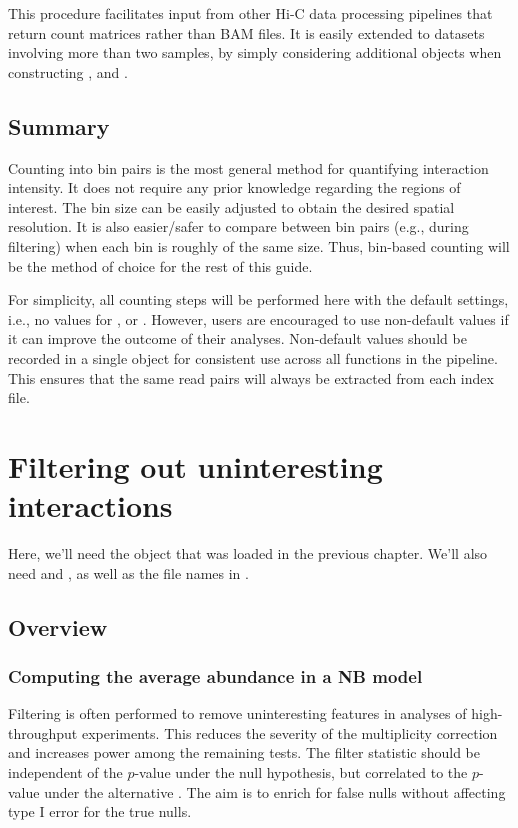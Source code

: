 \documentclass{report}\usepackage[]{graphicx}\usepackage[usenames,dvipsnames]{color}
\newenvironment{combox}
{ \definecolor{shadecolor}{RGB}{255, 240, 240} \begin{shaded}\begin{center}\begin{minipage}[t]{0.95\textwidth} }
{ \end{minipage}\end{center}\end{shaded} \definecolor{shadecolor}{RGB}{240,240,240} }
\begin{document}
This procedure facilitates input from other Hi-C data processing pipelines that return count matrices rather than BAM files.
It is easily extended to datasets involving more than two samples, by simply considering additional objects when constructing ,  and .

\section{Summary}
Counting into bin pairs is the most general method for quantifying interaction intensity.
It does not require any prior knowledge regarding the regions of interest.
The bin size can be easily adjusted to obtain the desired spatial resolution.
It is also easier/safer to compare between bin pairs (e.g., during filtering) when each bin is roughly of the same size.
Thus, bin-based counting will be the method of choice for the rest of this guide.

For simplicity, all counting steps will be performed here with the default settings, i.e., no values for ,  or .
However, users are encouraged to use non-default values if it can improve the outcome of their analyses.
Non-default values should be recorded in a single  object for consistent use across all functions in the  pipeline.
This ensures that the same read pairs will always be extracted from each index file.

\chapter{Filtering out uninteresting interactions}
\label{chap:filter}

\begin{combox}
Here, we'll need the  object that was loaded in the previous chapter.
We'll also need  and , as well as the file names in .
\end{combox}

\section{Overview}

\subsection{Computing the average abundance in a NB model}
Filtering is often performed to remove uninteresting features in analyses of high-throughput experiments. 
This reduces the severity of the multiplicity correction and increases power among the remaining tests. 
The filter statistic should be independent of the $p$-value under the null hypothesis, but correlated to the $p$-value under the alternative \cite{bourgon2010independent}. 
The aim is to enrich for false nulls without affecting type I error for the true nulls.
\end{document}
